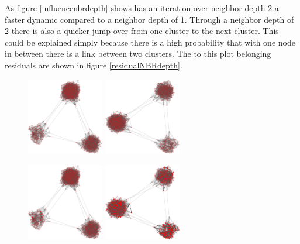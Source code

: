 As figure \ref{influencenbrdepth} shows has an iteration over neighbor depth 2 a faster dynamic compared to a neighbor depth of 1. Through a neighbor depth of 2 there is also a quicker jump over from one cluster to the next cluster. This could be explained simply because there is a high probability that with one node in between there is a link between two clusters. The to this plot belonging residuals are shown in figure \ref{residualNBRdepth}.

\begin{figure}
\centering
\includegraphics[width=0.3\textwidth]{batchRun__kHalf=6-6-6_maxUpdate=0.02_noize=0_nbrDepth=1/network0-crop.pdf}
\hskip2cm
\includegraphics[width=0.3\textwidth]{batchRun__kHalf=6-6-6_maxUpdate=0.02_noize=0_nbrDepth=2/network0-crop.pdf}

\includegraphics[width=0.3\textwidth]{batchRun__kHalf=6-6-6_maxUpdate=0.02_noize=0_nbrDepth=1/network250-crop.pdf}
\hskip2cm
\includegraphics[width=0.3\textwidth]{batchRun__kHalf=6-6-6_maxUpdate=0.02_noize=0_nbrDepth=2/network250-crop.pdf}


\end{figure}
